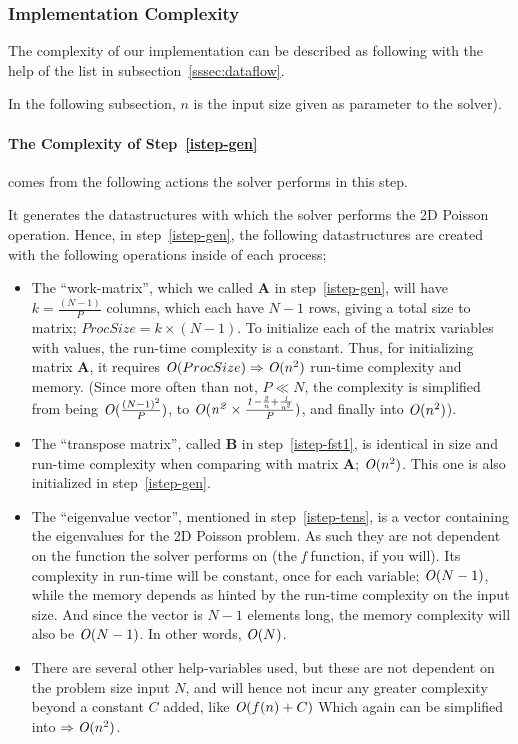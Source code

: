 \documentclass[fontsize=11pt,paper=a4,titlepage]{article}
\begin{document}
\subsubsection{Implementation Complexity}

The complexity of our implementation can be described as following with the help
of the list in subsection~\ref{sssec:dataflow}.

In the following subsection, $n$ is the input size given as parameter to the
solver).

\paragraph{The Complexity of Step~\ref{istep-gen}} comes from the following
actions the solver performs in this step.

It generates the datastructures with which the solver performs the 2D Poisson
operation. Hence, in step~\ref{istep-gen}, the following datastructures are
created with the following operations inside of each process;

\begin{itemize}
	\item The ``work-matrix'', which we called $\mathbf{A}$ in
	step~\ref{istep-gen}, will have $k = \frac{(N-1)}{P}$ columns, which each
	have $N-1$ rows, giving a total size to matrix; $ProcSize = k\times(N-1)$.
	To initialize each of the matrix variables with values, the run-time
	complexity is a constant. Thus, for initializing matrix $\mathbf{A}$, it
	requires ${\it O}(ProcSize)\Rightarrow {\it O}(n^2)$ run-time
	complexity and memory. (Since more often than not, $P \ll N$, the complexity
	is simplified from being ${\it O}(\frac{(N-1)^2}{P})$, to $\it
	{O}(n^2\times \frac{1-\frac{2}{n}+\frac{1}{n^2}}{P})$, and finally into
	${\it O}(n^2)$).

	\item The ``transpose matrix'', called $\mathbf{B}$ in
	step~\ref{istep-fst1}, is identical in size and run-time complexity when
	comparing with matrix $\mathbf{A}$; ${\it O}(n^2)$. This one is also
	initialized in step~\ref{istep-gen}.

	\item The ``eigenvalue vector'', mentioned in step~\ref{istep-tens}, is a
	vector containing the eigenvalues for the 2D Poisson problem. As such they
	are not dependent on the function the solver performs on (the \emph{f}
	function, if you will). Its complexity in run-time will be constant, once
	for each variable; ${\it O}(N-1)$, while the memory depends as hinted
	by the run-time complexity on the input size. And since the vector is $N-1$
	elements long, the memory complexity will also be ${\it O}(N-1)$.
	In other words, ${\it O}(N)$.

	\item There are several other help-variables used, but these are not
	dependent on the problem size input $N$, and will hence not incur any
	greater complexity beyond a constant $C$ added, like ${\it O}(f(n) + C)$
	Which again can be simplified into $\Rightarrow {\it O}(n^2)$.
\end{itemize}
\end{document}
